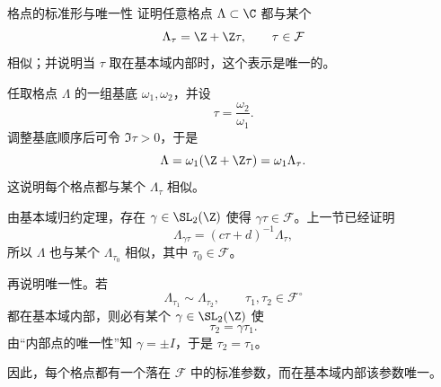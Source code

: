 \begin{problem}{格点的标准形与唯一性}
\hard
证明任意格点 $\Lambda\subset\C$ 都与某个
\[
\Lambda_\tau=\Z+\Z\tau,
\qquad \tau\in\mathcal{F}
\]
相似；并说明当 $\tau$ 取在基本域内部时，这个表示是唯一的。
\end{problem}
\begin{solution}
任取格点 $\Lambda$ 的一组基底 $\omega_1,\omega_2$，并设
\[
\tau=\frac{\omega_2}{\omega_1}.
\]
调整基底顺序后可令 $\Im\tau>0$，于是
\[
\Lambda=\omega_1(\Z+\Z\tau)=\omega_1\Lambda_\tau.
\]
这说明每个格点都与某个 $\Lambda_\tau$ 相似。

由基本域归约定理，存在 $\gamma\in\SL_2(\Z)$ 使得 $\gamma\tau\in\mathcal{F}$。上一节已经证明
\[
\Lambda_{\gamma\tau}=(c\tau+d)^{-1}\Lambda_\tau,
\]
所以 $\Lambda$ 也与某个 $\Lambda_{\tau_0}$ 相似，其中 $\tau_0\in\mathcal{F}$。

再说明唯一性。若
\[
\Lambda_{\tau_1}\sim \Lambda_{\tau_2},
\qquad \tau_1,\tau_2\in \mathcal{F}^{\circ}
\]
都在基本域内部，则必有某个 $\gamma\in\SL_2(\Z)$ 使
\[
\tau_2=\gamma\tau_1.
\]
由“内部点的唯一性”知 $\gamma=\pm I$，于是 $\tau_2=\tau_1$。

因此，每个格点都有一个落在 $\mathcal{F}$ 中的标准参数，而在基本域内部该参数唯一。
\end{solution}
